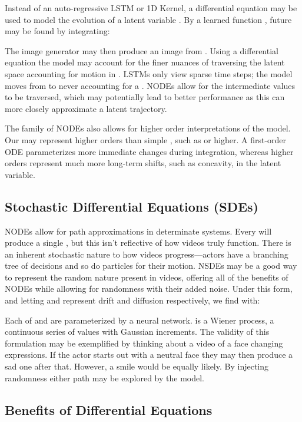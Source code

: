 \documentclass[tablecaption=bottom,pmlr]{jmlr}
\begin{document}
Instead of an auto-regressive LSTM or 1D Kernel, a differential equation may be used to model the evolution of a latent variable . By a learned function , future  may be found by integrating:




The image generator  may then produce an image from . Using a differential equation the model may account for the finer nuances of traversing the latent space accounting for motion in . LSTMs only view sparse time steps; the model moves from  to  never accounting for a . NODEs allow for the intermediate  values to be traversed, which may potentially lead to better performance as this can more closely approximate a latent trajectory.

The family of NODEs also allows for higher order interpretations of the model. Our  may represent higher orders than simple , such as  or higher. A first-order ODE parameterizes more immediate changes during integration, whereas higher orders represent much more long-term shifts, such as concavity, in the latent variable.

\subsection{Stochastic Differential Equations (SDEs)}

NODEs allow for path approximations in determinate systems. Every  will produce a single , but this isn't reflective of how videos truly function. There is an inherent stochastic nature to how videos progress---actors have a branching tree of decisions and so do particles for their motion. NSDEs may be a good way to represent the random nature present in videos, offering all of the benefits of NODEs while allowing for randomness with their added noise. Under this form, and letting  and  represent drift and diffusion respectively, we find  with:



Each of  and  are parameterized by a neural network.  is a Wiener process, a continuous series of values with Gaussian increments.  The validity of this formulation may be exemplified by thinking about a video of a face changing expressions. If the actor starts out with a neutral face they may then produce a sad one after that. However, a smile would be equally likely. By injecting randomness either path may be explored by the model.

\subsection{Benefits of Differential Equations}
\end{document}
